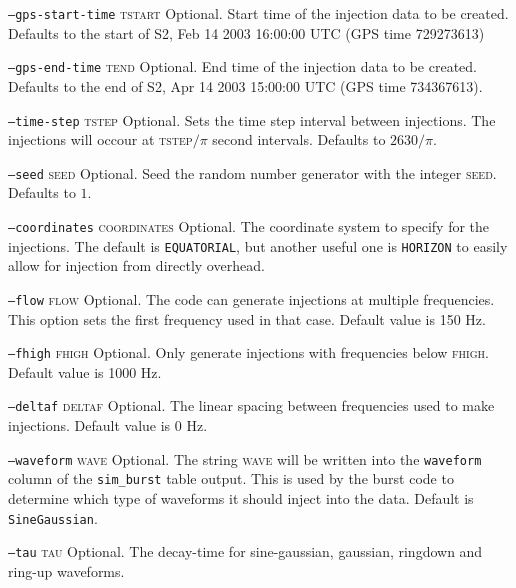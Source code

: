 \begin{entry}
\begin{entry}
\item[\texttt{--gps-start-time} \textsc{tstart}]
Optional.  Start time of the injection data to be created. Defaults to the
start of S2, Feb 14 2003 16:00:00 UTC (GPS time 729273613)

\item[\texttt{--gps-end-time} \textsc{tend}]
Optional. End time of the injection data to be created. Defaults to the end of
S2, Apr 14 2003 15:00:00 UTC (GPS time 734367613).

\item[\texttt{--time-step} \textsc{tstep}]
Optional. Sets the time step interval between injections. The injections will
occour at \textsc{tstep}$/\pi$ second intervals. Defaults to $2630/\pi$.

\item[\texttt{--seed} \textsc{seed}]
Optional. Seed the random number generator with the integer \textsc{seed}.
Defaults to $1$.

\item[\texttt{--coordinates} \textsc{coordinates}] 
Optional.  The coordinate system to specify for the injections.  The
default is \verb+EQUATORIAL+,   but another useful one is
\verb+HORIZON+ to easily allow for injection from directly overhead.

\item[\texttt{--flow} \textsc{flow}]
Optional.  The code can generate injections at multiple frequencies.
This option sets the first frequency used in that case.  Default value
is 150 Hz.

\item[\texttt{--fhigh} \textsc{fhigh}]
Optional.  Only generate injections with frequencies below
\textsc{fhigh}.  Default value is 1000 Hz.

\item[\texttt{--deltaf} \textsc{deltaf}]
Optional.  The linear spacing between frequencies used to make
injections.  Default value is 0 Hz.

\item[\texttt{--waveform} \textsc{wave}]
Optional. The string \textsc{wave} will be written into the \texttt{waveform}
column of the \texttt{sim\_burst} table output. This is used by the
burst code to determine which type of waveforms it should inject into the
data. Default is \texttt{SineGaussian}.

\item[\texttt{--tau} \textsc{tau}]
Optional.  The decay-time for sine-gaussian,  gaussian,  ringdown and
ring-up waveforms.


\end{entry}
\end{entry}
